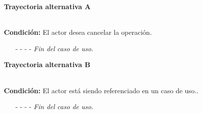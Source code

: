 \hypertarget{CU10-3:TAA}{\textbf{Trayectoria alternativa A}}\\
\noindent \textbf{Condición:} El actor desea cancelar la operación.
\begin{enumerate}
	\UCpaso[\UCactor] Oprime el botón  de la pantalla emergente.
	\UCpaso[\UCsist] Muestra la pantalla .
	\item[- -] - - {\em {Fin del caso de uso}}.%
\end{enumerate}	
\hypertarget{CU10-3:TAB}{\textbf{Trayectoria alternativa B}}\\
\noindent \textbf{Condición:} El actor está siendo referenciado en un caso de uso..
\begin{enumerate}
	\UCpaso[\UCsist] Muestra el mensaje  en la pantalla .
	\item[- -] - - {\em {Fin del caso de uso}}.
\end{enumerate}

